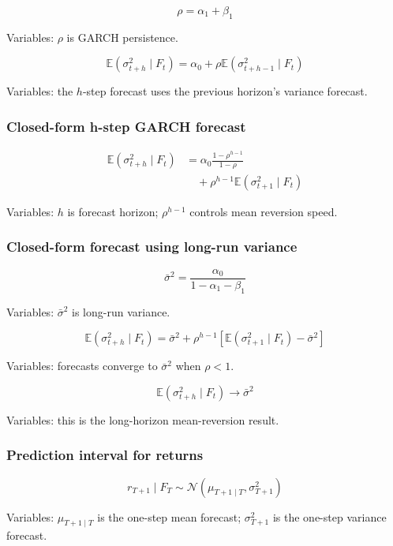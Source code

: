 \documentclass[
  8pt,
  twocolumn]{extarticle}
\begin{document}
\[
\rho=\alpha_1+\beta_1
\]

Variables: \(\rho\) is GARCH persistence.

\[
\mathbb E(\sigma_{t+h}^2\mid F_t)=\alpha_0+\rho\mathbb E(\sigma_{t+h-1}^2\mid F_t)
\]

Variables: the \(h\)-step forecast uses the previous horizon's variance
forecast.

\subsubsection{Closed-form h-step GARCH
forecast}\label{closed-form-h-step-garch-forecast}

\[
\begin{aligned}
\mathbb E(\sigma_{t+h}^2\mid F_t)
&=\alpha_0\frac{1-\rho^{h-1}}{1-\rho}\\
&\quad+\rho^{h-1}\mathbb E(\sigma_{t+1}^2\mid F_t)
\end{aligned}
\]

Variables: \(h\) is forecast horizon; \(\rho^{h-1}\) controls mean
reversion speed.

\subsubsection{Closed-form forecast using long-run
variance}\label{closed-form-forecast-using-long-run-variance}

\[
\bar\sigma^2=\frac{\alpha_0}{1-\alpha_1-\beta_1}
\]

Variables: \(\bar\sigma^2\) is long-run variance.

\[
\mathbb E(\sigma_{t+h}^2\mid F_t)=\bar\sigma^2+\rho^{h-1}\left[\mathbb E(\sigma_{t+1}^2\mid F_t)-\bar\sigma^2\right]
\]

Variables: forecasts converge to \(\bar\sigma^2\) when \(\rho<1\).

\[
\mathbb E(\sigma_{t+h}^2\mid F_t)\to\bar\sigma^2
\]

Variables: this is the long-horizon mean-reversion result.

\subsubsection{Prediction interval for
returns}\label{prediction-interval-for-returns}

\[
r_{T+1}\mid F_T\sim\mathcal N(\mu_{T+1\mid T},\sigma_{T+1}^2)
\]

Variables: \(\mu_{T+1\mid T}\) is the one-step mean forecast;
\(\sigma_{T+1}^2\) is the one-step variance forecast.
\end{document}
